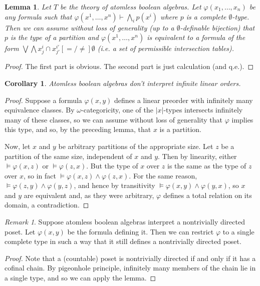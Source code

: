\documentclass[final,a4paper,12pt]{amsart}
\newtheorem{lem}[thm]{Lemma}
\newtheorem{cor}[thm]{Corollary}
\theoremstyle{remark}
\newtheorem{rem}[thm]{Remark}
\theoremstyle{definition}
\newcommand{\proves}{\mathrel{\vdash}}
\newcommand{\bigland}{\bigwedge}
\newcommand{\biglor}{\bigvee}
\begin{document}
	\begin{lem}
		Let $T$ be the theory of atomless boolean algebras. Let $\varphi(x_1,\ldots,x_n)$ be any formula such that $\varphi(x^1,\ldots,x^n)\proves \bigland_i p(x^i)$ where $p$ is a complete $\emptyset$-type. Then we can assume without loss of generality (up to a $\emptyset$-definable bijection) that $p$ is the type of a partition and $\varphi(x^1,\ldots,x^n)$ is equivalent to a formula of the form $\biglor\bigland x_j^i\cap x_{j'}^{i'}\mathrel{[{=}/{\neq}]}\emptyset$ (i.e. a set of \emph{permissible} intersection tables).
	\end{lem}
	\begin{proof}
		The first part is obvious. The second part is just calculation (and q.e.).
	\end{proof}
	
	\begin{cor}
		Atomless boolean algebras don't interpret infinite linear orders.
	\end{cor}
	\begin{proof}
		Suppose a formula $\varphi(x,y)$ defines a linear preorder with infinitely many equivalence classes. By $\omega$-categoricity, one of the $\lvert x\rvert$-types intersects infinitely many of these classes, so we can assume without loss of generality that $\varphi$ implies this type, and so, by the preceding lemma, that $x$ is a partition.
		
		Now, let $x$ and $y$ be arbitrary partitions of the appropriate size. Let $z$ be a partition of the same size, independent of $x$ and $y$. Then by linearity, either $\models \varphi(x,z)$ or $\models \varphi(z,x)$. But the type of $x$ over $z$ is the same as the type of $z$ over $x$, so in fact $\models\varphi(x,z)\land \varphi(z,x)$. For the same reason, $\models \varphi(z,y)\land \varphi(y,z)$, and hence by transitivity $\models \varphi(x,y)\land \varphi(y,x)$, so $x$ and $y$ are equivalent and, as they were arbitrary, $\varphi$ defines a total relation on its domain, a contradiction.
	\end{proof}
	
	\begin{rem}
		Suppose atomless boolean algebras interpret a nontrivially directed poset. Let $\varphi(x,y)$ be the formula defining it. Then we can restrict $\varphi$ to a single complete type in such a way that it still defines a nontrivially directed poset.
	\end{rem}
	\begin{proof}
		Note that a (countable) poset is nontrivially directed if and only if it has a cofinal chain. By pigeonhole principle, infinitely many members of the chain lie in a single type, and so we can apply the lemma. 
	\end{proof}
	
\end{document}
